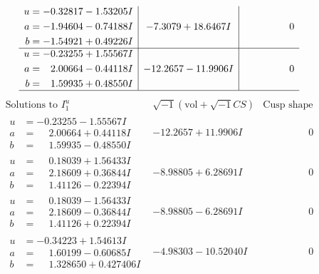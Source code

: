 \documentclass[1p]{elsarticle_modified}
\theoremstyle{definition}
\newcommand{\I}{\sqrt{-1}}
\begin{document}
$$\begin{array}{c|c|c}
\begin{aligned}
u &= -0.32817 - 1.53205 I \\
a &= -1.94604 - 0.74188 I \\
b &= -1.54921 + 0.49226 I\end{aligned}
 & -7.3079 + 18.6467 I & \phantom{-0.000000 } 0 \\ \hline\begin{aligned}
u &= -0.23255 + 1.55567 I \\
a &= \phantom{-}2.00664 - 0.44118 I \\
b &= \phantom{-}1.59935 + 0.48550 I\end{aligned}
 & -12.2657 - 11.9906 I & \phantom{-0.000000 } 0\\
 \hline 
 \end{array}$$\newpage$$\begin{array}{c|c|c}  
\text{Solutions to }I^u_{1}& \I (\text{vol} + \sqrt{-1}CS) & \text{Cusp shape}\\
 \hline 
\begin{aligned}
u &= -0.23255 - 1.55567 I \\
a &= \phantom{-}2.00664 + 0.44118 I \\
b &= \phantom{-}1.59935 - 0.48550 I\end{aligned}
 & -12.2657 + 11.9906 I & \phantom{-0.000000 } 0 \\ \hline\begin{aligned}
u &= \phantom{-}0.18039 + 1.56433 I \\
a &= \phantom{-}2.18609 + 0.36844 I \\
b &= \phantom{-}1.41126 - 0.22394 I\end{aligned}
 & -8.98805 + 6.28691 I & \phantom{-0.000000 } 0 \\ \hline\begin{aligned}
u &= \phantom{-}0.18039 - 1.56433 I \\
a &= \phantom{-}2.18609 - 0.36844 I \\
b &= \phantom{-}1.41126 + 0.22394 I\end{aligned}
 & -8.98805 - 6.28691 I & \phantom{-0.000000 } 0 \\ \hline\begin{aligned}
u &= -0.34223 + 1.54613 I \\
a &= \phantom{-}1.60199 - 0.60685 I \\
b &= \phantom{-}1.328650 + 0.427406 I\end{aligned}
 & -4.98303 - 10.52040 I & \phantom{-0.000000 } 0 \\ \hline\begin{aligned}

\end{aligned}
\end{array}$$
\end{document}
